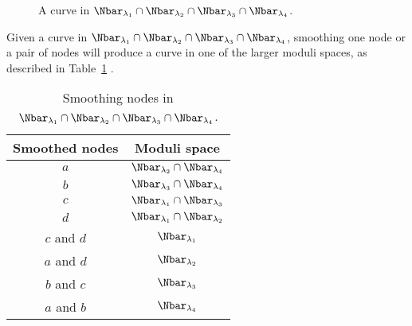 \begin{example}
\begin{figure}[ht]
\begin{tikzpicture}
\end{tikzpicture}
\caption{A curve in $\Nbar_{\lambda_1} \cap \Nbar_{\lambda_2} \cap \Nbar_{\lambda_3} \cap \Nbar_{\lambda_4}$.}
\label{pic4int}
\end{figure}
Given a curve in $\Nbar_{\lambda_1} \cap \Nbar_{\lambda_2} \cap \Nbar_{\lambda_3} \cap \Nbar_{\lambda_4}$, smoothing one node or a pair of nodes will produce a curve in one of the larger moduli spaces, as described in Table~\ref{table4int}
.\begin{table}[ht]
\centering
\begin{tabular}{|c|c|}
\hline
Smoothed nodes & Moduli space
\\
\hline
$a$ & $\Nbar_{\lambda_2} \cap \Nbar_{\lambda_4}$
\\
\hline
$b$ & $\Nbar_{\lambda_3} \cap \Nbar_{\lambda_4}$
\\
\hline
$c$ & $\Nbar_{\lambda_1} \cap \Nbar_{\lambda_3}$
\\
\hline
$d$ & $\Nbar_{\lambda_1} \cap \Nbar_{\lambda_2}$
\\
\hline
$c$ and $d$ & $\Nbar_{\lambda_1}$
\\
\hline
$a$ and $d$ & $\Nbar_{\lambda_2}$
\\
\hline
$b$ and $c$ & $\Nbar_{\lambda_3}$
\\
\hline
$a$ and $b$ & $\Nbar_{\lambda_4}$
\\
\hline
\end{tabular}
\caption{Smoothing nodes in $\Nbar_{\lambda_1} \cap \Nbar_{\lambda_2} \cap \Nbar_{\lambda_3} \cap \Nbar_{\lambda_4}$.}
\label{table4int}
\end{table}
\end{example}

